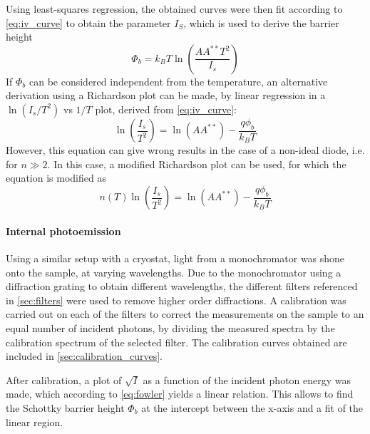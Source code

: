 Using least-squares regression, the obtained curves were then fit according to \autoref{eq:iv_curve} to obtain the parameter $I_S$, which is used to derive the barrier height
\begin{equation}
    \Phi_b = k_B T \ln\left(\frac{A A^{**} T^2}{I_s}\right)
\end{equation}
If $\Phi_b$ can be considered independent from the temperature, an alternative derivation using a Richardson plot can be made, by linear regression in a $\ln(I_s/T^2)$ vs $1/T$ plot, derived from \autoref{eq:iv_curve}:
\begin{equation} \label{eq:richardson}
    \ln \left(\frac{I_s}{T^2}\right) = \ln(A A^{**}) - \frac{q \phi_b}{k_B T}
\end{equation}
However, this equation can give wrong results in the case of a non-ideal diode, i.e. for $n \gg 2$. In this case, a modified Richardson plot can be used, for which the equation is modified as \cite{bhuiyan_new_1988}
\begin{equation} \label{eq:modified_richardson}
    n(T) \ln \left(\frac{I_s}{T^2}\right) = \ln(A A^{**}) - \frac{q \phi_b}{k_B T}
\end{equation}

\paragraph{Internal photoemission}
Using a similar setup with a cryostat, light from a monochromator was shone onto the sample, at varying wavelengths.
Due to the monochromator using a diffraction grating to obtain different wavelengths, the different filters referenced in \autoref{sec:filters} were used to remove higher order diffractions.
A calibration was carried out on each of the filters to correct the measurements on the sample to an equal number of incident photons, by dividing the measured spectra by the calibration spectrum of the selected filter.
The calibration curves obtained are included in \autoref{sec:calibration_curves}.

After calibration, a plot of $\sqrt{I}$ as a function of the incident photon energy was made, which according to \autoref{eq:fowler} yields a linear relation.
This allows to find the Schottky barrier height $\Phi_b$ at the intercept between the x-axis and a fit of the linear region.
